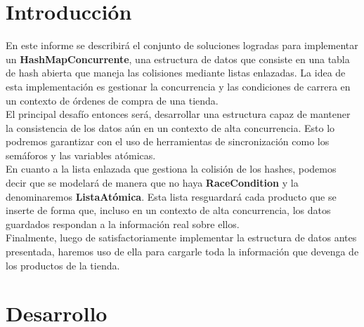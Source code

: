 \documentclass[a4paper]{article}
\begin{document}

\newcommand{\dato}{\textit{Dato}}
\newcommand{\individuo}{\textit{Individuo}}


\maketitle
\newpage

\renewcommand{\contentsname}{Índice}
\tableofcontents
\newpage


\section{Introducción}\label{sec:intro}
\text
{
En este informe se describirá el conjunto de soluciones logradas para implementar un \textbf{HashMapConcurrente}, una estructura de datos que consiste en una tabla de hash abierta que maneja las colisiones mediante listas enlazadas. La idea de esta implementación es gestionar la concurrencia y las condiciones de carrera en un contexto de órdenes de compra de una tienda. 
\\
El principal desafío entonces será, desarrollar una estructura capaz de mantener la consistencia de los datos aún en un contexto de alta concurrencia. Esto lo podremos garantizar con el uso de herramientas de sincronización como los semáforos y las variables atómicas.
\\
En cuanto a la lista enlazada que gestiona la colisión de los hashes, podemos decir que se modelará de manera que no haya \textbf{RaceCondition} y la denominaremos \textbf{ListaAtómica}. Esta lista resguardará cada producto que se inserte de forma que, incluso en un contexto de alta concurrencia, los datos guardados respondan a la información real sobre ellos.
\\
Finalmente, luego de satisfactoriamente implementar la estructura de datos antes presentada, haremos uso de ella para cargarle toda la información que devenga de los productos de la tienda. 
}
\newpage

\section{Desarrollo}\label{sec:desarrollo}
\end{document}
